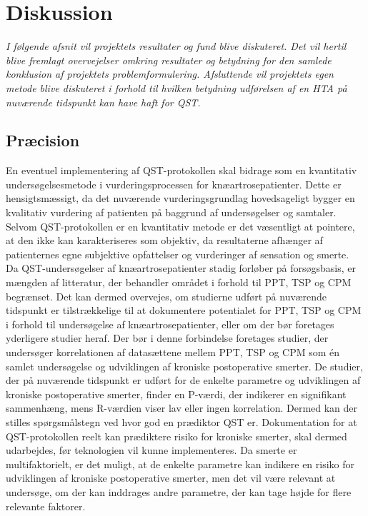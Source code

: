 \section{Diskussion}
\textit{I følgende afsnit vil projektets resultater og fund blive diskuteret. Det vil hertil blive fremlagt overvejelser omkring resultater og betydning for den samlede konklusion af projektets problemformulering. Afsluttende vil projektets egen metode blive diskuteret i forhold til hvilken betydning udførelsen af en HTA på nuværende tidspunkt kan have haft for QST.}


\subsection{Præcision} \label{Praecision} %
En eventuel implementering af QST-protokollen skal bidrage som en kvantitativ undersøgelsesmetode i vurderingsprocessen for knæartrosepatienter. Dette er hensigtsmæssigt, da det nuværende vurderingsgrundlag hovedsageligt bygger en kvalitativ vurdering af patienten på baggrund af undersøgelser og samtaler. Selvom QST-protokollen er en kvantitativ metode er det væsentligt at pointere, at den ikke kan karakteriseres som objektiv, da resultaterne afhænger af patienternes egne subjektive opfattelser og vurderinger af sensation og smerte.\\ 
Da QST-undersøgelser af knæartrosepatienter stadig forløber på forsøgsbasis, er mængden af litteratur, der behandler området i forhold til PPT, TSP og CPM  begrænset. Det kan dermed overvejes, om studierne udført på nuværende tidspunkt er tilstrækkelige til at dokumentere potentialet for PPT, TSP og CPM i forhold til undersøgelse af knæartrosepatienter, eller om der bør foretages yderligere studier heraf. Der bør i denne forbindelse foretages studier, der undersøger korrelationen af datasættene mellem PPT, TSP og CPM som én samlet undersøgelse og udviklingen af kroniske postoperative smerter. De studier, der på nuværende tidspunkt er udført for de enkelte parametre og udviklingen af kroniske postoperative smerter, finder en P-værdi, der indikerer en signifikant sammenhæng, mens R-værdien viser lav eller ingen korrelation. Dermed kan der stilles spørgsmålstegn ved hvor god en prædiktor QST er. Dokumentation for at QST-protokollen reelt kan prædiktere risiko for kroniske smerter, skal dermed udarbejdes, før teknologien vil kunne implementeres. Da smerte er multifaktorielt, er det muligt, at de enkelte parametre kan indikere en risiko for udviklingen af kroniske postoperative smerter, men det vil være relevant at undersøge, om der kan inddrages andre parametre, der kan tage højde for flere relevante faktorer.\\
